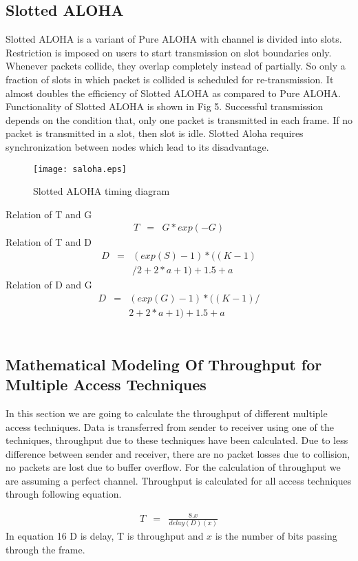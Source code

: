 \documentclass[10pt, conference, compsocconf]{IEEEtran}
\begin{document}
\subsection{Slotted ALOHA}
Slotted ALOHA is a variant of Pure ALOHA with channel is divided into slots. Restriction is imposed on users to start transmission on slot boundaries only. Whenever packets collide, they overlap completely instead of partially. So only a fraction of slots in which packet is collided is scheduled for re-transmission. It almost doubles the efficiency of Slotted ALOHA as compared to Pure ALOHA.
Functionality of Slotted ALOHA is shown in Fig 5. Successful transmission depends on the condition that, only one packet is transmitted in each frame. If no packet is transmitted in a slot, then slot is idle. Slotted Aloha requires synchronization between nodes which lead to its disadvantage.
\begin{figure}[!h]
\centering
\caption{Slotted ALOHA timing diagram}
\texttt{[image: saloha.eps]}
\end{figure}
Relation of T and G
\begin{eqnarray}
T&=&G*exp(-G)
\end{eqnarray}
Relation of T and D
\begin{eqnarray}
D&=&(exp(S)-1)*((K-1)\nonumber\\
& &/2+2*a+1)+1.5+a
\end{eqnarray}
Relation of D and G
\begin{eqnarray}
D&=&(exp(G)-1)*((K-1)/ \nonumber\\
& &2+2*a+1)+1.5+a
\end{eqnarray}
\\
\subsection{Mathematical Modeling Of Throughput for Multiple Access Techniques}
In this section we are going to calculate the throughput of different multiple access techniques. Data is transferred from sender to receiver using one of the techniques, throughput due to these techniques have been calculated. Due to less difference between sender and receiver, there are no packet losses due to collision, no packets are lost due to buffer overflow. For the calculation of throughput we are assuming a perfect channel. Throughput is calculated for all access techniques through following equation.

\begin{eqnarray}
T&=& \frac{8.x}{delay(D) (x)}
\end{eqnarray}
In equation 16 D is delay, T is throughput and $x$ is the number of bits passing through the frame.
\end{document}
